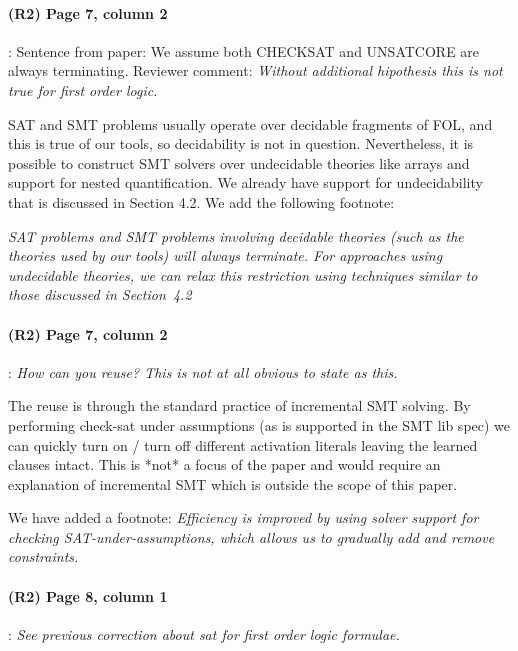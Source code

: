 \documentclass{article}
\begin{document}
\paragraph{(R2) Page 7, column 2}: Sentence from paper: We assume both CHECKSAT and UNSATCORE are always terminating.  Reviewer comment:
\textit{Without additional hipothesis this is not true
for first order logic.}
\vspace{0.05in}

\noindent SAT and SMT problems usually operate over decidable fragments of FOL, and this is true of our tools, so decidability is not in question.  Nevertheless, it is possible to construct SMT solvers over undecidable theories like arrays and support for nested quantification. We already have support for undecidability that is discussed in Section 4.2. We add the following footnote:

\textit{SAT problems and SMT problems involving decidable theories (such as the theories used by our tools) will always terminate.  For approaches using undecidable theories, we can relax this restriction using  techniques similar to those discussed in Section~4.2}


\paragraph{(R2) Page 7, column 2}: \textit{How can you reuse? This is not at all obvious to state as this.}
\vspace{0.05in}

\noindent The reuse is through the standard practice of incremental SMT solving. By performing check-sat under assumptions (as is supported in the SMT lib spec) we can quickly turn on / turn off different activation literals leaving the learned clauses intact. This is
*not* a focus of the paper and would require an explanation of incremental SMT which is outside the scope of this paper.

We have added a footnote: \textit{Efficiency is improved by using solver support for checking SAT-under-assumptions, which allows us to gradually add and remove constraints.}


\paragraph{(R2) Page 8, column 1}: \textit{See previous correction about sat for first
order logic formulae.}
\vspace{0.05in}
\end{document}
